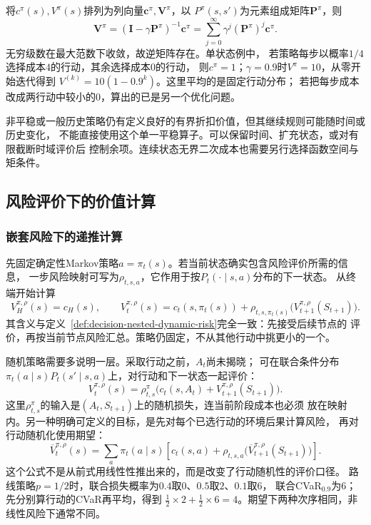 将$c^\pi(s),V^\pi(s)$排列为列向量$\bm c^\pi,\bm V^\pi$，以
$P^\pi(s,s')$为元素组成矩阵$\bm P^\pi$，则
\[
  \bm V^\pi=(\bm I-\gamma\bm P^\pi)^{-1}\bm c^\pi
  =\sum_{j=0}^\infty\gamma^j(\bm P^\pi)^j\bm c^\pi.
\]
无穷级数在最大范数下收敛，故逆矩阵存在。单状态例中，
若策略每步以概率$1/4$选择成本$4$的行动，其余选择成本$0$的行动，
则$c^\pi=1$；$\gamma=0.9$时$V^\pi=10$，从零开始迭代得到
$V^{(k)}=10(1-0.9^k)$。这里平均的是固定行动分布；
若把每步成本改成两行动中较小的$0$，算出的已是另一个优化问题。

非平稳或一般历史策略仍有定义良好的有界折扣价值，但其继续规则可能随时间或历史变化，
不能直接使用这个单一平稳算子。可以保留时间、扩充状态，或对有限截断时域评价后
控制余项。连续状态无界二次成本也需要另行选择函数空间与矩条件。

\subsection{风险评价下的价值计算}

\subsubsection{嵌套风险下的递推计算}
\label{sec:policy-nested-risk-evaluation}

先固定确定性Markov策略$a=\pi_t(s)$。若当前状态确实包含风险评价所需的信息，
一步风险映射可写为$\rho_{t,s,a}$，它作用于按$P_t(\cdot\mid s,a)$分布的下一状态。
从终端开始计算
\[
  V_H^{\pi,\rho}(s)=c_H(s),\qquad
  V_t^{\pi,\rho}(s)
  =c_t(s,\pi_t(s))+
    \rho_{t,s,\pi_t(s)}\bigl(V_{t+1}^{\pi,\rho}(S_{t+1})\bigr).
\]
其含义与定义~\ref{def:decision-nested-dynamic-risk}完全一致：先接受后续节点的
评价，再按当前节点风险汇总。策略仍固定，不从其他行动中挑更小的一个。

随机策略需要多说明一层。采取行动之前，$A_t$尚未揭晓；
可在联合条件分布
$\pi_t(a\mid s)P_t(s'\mid s,a)$上，对行动和下一状态一起评价：
\begin{equation}
  V_t^{\pi,\rho}(s)=
  \rho^\pi_{t,s}\bigl(c_t(s,A_t)+V_{t+1}^{\pi,\rho}(S_{t+1})\bigr).
  \label{eq:policy-joint-action-risk-evaluation}
\end{equation}
这里$\rho^\pi_{t,s}$的输入是$(A_t,S_{t+1})$上的随机损失，连当前阶段成本也必须
放在映射内。另一种明确可定义的目标，是先对每个已选行动的环境后果计算风险，
再对行动随机化使用期望：
\[
  \overline V_t^{\pi,\rho}(s)=\sum_a\pi_t(a\mid s)
    \left[c_t(s,a)+\rho_{t,s,a}
      \bigl(\overline V_{t+1}^{\pi,\rho}(S_{t+1})\bigr)\right].
\]
这个公式不是从前式用线性性推出来的，而是改变了行动随机性的评价口径。
路线策略$p=1/2$时，联合损失概率为$0.4$取$0$、$0.5$取$2$、$0.1$取$6$，
联合CVaR$_{0.9}$为$6$；先分别算行动的CVaR再平均，得到
$\tfrac12\times2+\tfrac12\times6=4$。期望下两种次序相同，非线性风险下通常不同。

